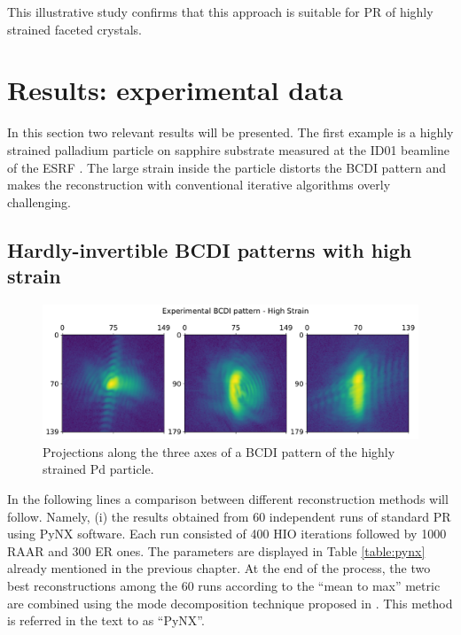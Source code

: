This illustrative study confirms that this approach is suitable for PR of highly strained faceted crystals. 

\section{Results: experimental data}

In this section two relevant results will be presented. The first example is a highly strained palladium particle on 
sapphire substrate measured at the ID01 beamline of the ESRF \cite{bellec2026ultrafast}. 
The large strain inside the particle distorts the BCDI pattern and makes the reconstruction with conventional iterative 
algorithms overly challenging. 

\subsection{Hardly-invertible BCDI patterns with high strain}

\begin{figure}[H]
  \centering
  \includegraphics[width=\textwidth]{figures/AD/AD_exp3_michael.pdf}
  \caption{Projections along the three axes of a BCDI pattern of the highly strained Pd particle. }
  \label{fig:projections_michael}
\end{figure}

In the following lines a comparison between different reconstruction methods will follow. Namely, (i) the results obtained 
from 60 independent runs of standard PR using PyNX software. Each run consisted of 400 HIO iterations followed by 1000 RAAR and 
300 ER ones. The parameters are displayed in Table \ref{table:pynx} already mentioned in the previous chapter. 
At the end of the process, the two best reconstructions among the 60 runs according to the ``mean to max'' metric 
are combined using the mode decomposition technique proposed in \cite{favre-nicolin_free_2020}. 
This method is referred in the text to as ``PyNX''. 
  
